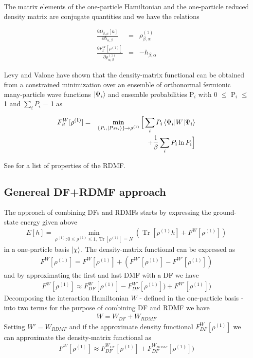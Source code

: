 \documentclass[%
 reprint,
nofootinbib,
 amsmath,amssymb,
 aps,
]{revtex4-2}
\DeclareMathOperator{\Tr}{Tr}
\begin{document}
The matrix elements of the one-particle Hamiltonian and the one-particle reduced density matrix are conjugate quantities and we have the relations

\begin{eqnarray}
\frac{\partial\Omega_{\beta,\mu}[h]}{\partial h_{\alpha, \beta}}&=&\rho^{(1)}_{\beta,\alpha} \\
\frac{\partial F^W_\beta[\rho^{(1)}]}{\partial \rho^{(1)}_{\alpha, \beta}} &=& -h_{\beta, \alpha}
\end{eqnarray}

Levy\cite{levy1979universal} and Valone\cite{Valone1980} have shown that the density-matrix functional can be obtained from a constrained minimization over an ensemble of orthonormal fermionic many-particle wave functions $\ket{\Psi_i}$ and ensemble probabilities P$_i$ with 0 $\leq$ P$_i$ $\leq$ 1 and $\sum_iP_i$ = 1 as

\begin{eqnarray}
F^W_\beta[\rho^{(1)}] &=& \min_{\{P_i,\ket{Psi_i}\}\rightarrow \rho^{(1)}} \Big[ \sum_iP_i\braket{\Psi_i|W|\Psi_i}\nonumber\\
&&+\frac{1}{\beta}\sum_iP_i\ln{P_i}\Big] 
\end{eqnarray}

See \cite{schade2019new} for a list of properties of the RDMF. 
\subsection{Genereal DF+RDMF approach}
The approach of combining DFs and RDMFs starts by expressing the ground-state energy given above 
\begin{eqnarray}
E[h] = \min_{\rho^{(1)}:0\leq\rho^{(1)}\leq 1,\Tr[\rho^{(1)}]=N}(\Tr[\rho^{(1)}h]+F^W[\rho^{(1)}])
\end{eqnarray}
in a one-particle basis $\ket{\chi}$. 
The density-matrix functional can be expressed as
\begin{eqnarray}
F^W[\rho^{(1)}]=F^W[\rho^{(1)}] + (F^{W'}[\rho^{(1)}]-F^{W'}[\rho^{(1)}]) \label{firstDensityMatrixFunctionalDefinition}
\end{eqnarray}
and by approximating the first and last DMF with a DF we have
\begin{eqnarray}
F^W[\rho^{(1)}]\approx F^W_{DF}[\rho^{(1)}]-F^{W'}_{DF}[\rho^{(1)}])+F^{W'}[\rho^{(1)}])
\end{eqnarray}
Decomposing the interaction Hamiltonian $W$ - defined in the one-particle basis \cite{schade2019new} - into two terms for the purpose of combining DF and RDMF we have
\begin{eqnarray}
W=W_{DF}+W_{RDMF}
\end{eqnarray}
Setting $W'=W_{RDMF}$ and if the approximate density functional $F^W_{DF}[\rho^{(1)}]$ we can approximate the density-matrix functional as 
\begin{eqnarray}
F^W[\rho^{(1)}]\approx F^{W_{DF}}_{DF}[\rho^{(1)}]+F^{W_{RDMF}}_{DF}[\rho^{(1)}])
\end{eqnarray}
\end{document}
